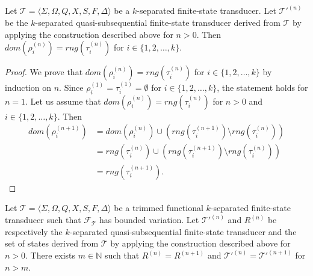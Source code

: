 \begin{proposition}
  Let $\mathcal{T} = \langle \Sigma, \Omega, Q, X, S, F, \Delta \rangle$ be a
  $k$-separated finite-state transducer. Let $\mathcal{T}'^{(n)}$ be the
  $k$-separated quasi-subsequential finite-state transducer derived from
  $\mathcal{T}$ by applying the construction described above for $n > 0$. Then
  $dom(\rho_i^{(n)}) = rng(\tau_i^{(n)})$ for $i \in \{ 1, 2, \ldots, k \}$.
\end{proposition}

\begin{proof}
  We prove that $dom(\rho_i^{(n)}) = rng(\tau_i^{(n)})$ for $i \in \{ 1, 2, \ldots,
  k \}$ by induction on $n$. Since $\rho_i^{(1)} = \tau_i^{(1)} = \emptyset$ for $i
  \in \{ 1, 2, \ldots, k \}$, the statement holds for $n = 1$. Let us assume that
  $dom(\rho_i^{(n)}) = rng(\tau_i^{(n)})$ for $n > 0$ and $i \in \{ 1, 2, \ldots, k
  \}$. Then
  \begin{align*}
    dom(\rho_i^{(n+1)}) & = dom(\rho_i^{(n)}) \cup (rng(\tau_i^{(n+1)}) \setminus
    rng(\tau_i^{(n)}))\\
                        & = rng(\tau_i^{(n)}) \cup (rng(\tau_i^{(n+1)}) \setminus
    rng(\tau_i^{(n)}))\\
                        & = rng(\tau_i^{(n+1)}).
  \end{align*}
\end{proof}

\begin{lemma}\label{lem:quasisubseq_completion}
  Let $\mathcal{T} = \langle \Sigma, \Omega, Q, X, S, F, \Delta \rangle$ be a trimmed
  functional $k$-separated finite-state transducer such that
  $\mathcal{F}_\mathcal{T}$ has bounded variation. Let $\mathcal{T'}^{(n)}$ and
  $R^{(n)}$ be respectively the $k$-separated quasi-subsequential finite-state
  transducer and the set of states derived from $\mathcal{T}$ by applying the
  construction described above for $n > 0$. There exists $m \in \mathbb{N}$ such that
  $R^{(n)} = R^{(n+1)}$ and $\mathcal{T}'^{(n)} = \mathcal{T}'^{(n+1)}$ for $n > m$.
\end{lemma}

